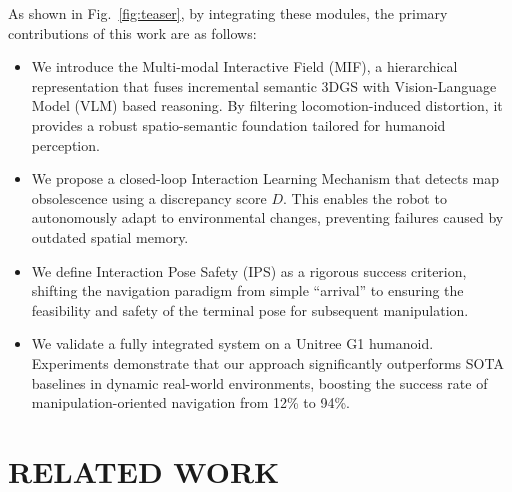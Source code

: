 \documentclass[conference]{IEEEtran}
\begin{document}
As shown in Fig.~\ref{fig:teaser}, by integrating these modules, the primary contributions of this work are as follows:

\begin{itemize}
    \item We introduce the Multi-modal Interactive Field (MIF), a hierarchical representation that fuses incremental semantic 3DGS with Vision-Language Model (VLM) based reasoning. By filtering locomotion-induced distortion, it provides a robust spatio-semantic foundation tailored for humanoid perception.
    
    \item We propose a closed-loop Interaction Learning Mechanism that detects map obsolescence using a discrepancy score $D$. This enables the robot to autonomously adapt to environmental changes, preventing failures caused by outdated spatial memory.
    
    \item We define Interaction Pose Safety (IPS) as a rigorous success criterion, shifting the navigation paradigm from simple ``arrival'' to ensuring the feasibility and safety of the terminal pose for subsequent manipulation.
    
    \item We validate a fully integrated system on a Unitree G1 humanoid. Experiments demonstrate that our approach significantly outperforms SOTA baselines in dynamic real-world environments, boosting the success rate of manipulation-oriented navigation from 12\% to 94\%.
\end{itemize}

\section{RELATED WORK}
\label{sec:related_work}
\end{document}
